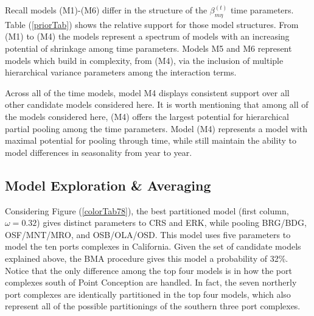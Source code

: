 \documentclass[12pt]{article}
\begin{document}
Recall models (M1)-(M6) differ in the structure of the \(\beta^{(t)}_{m\eta}\) 
time parameters. Table (\ref{priorTab}) shows the relative support for those 
model structures. From (M1) to (M4) the models represent a spectrum of models 
with an increasing potential of shrinkage among time parameters. Models 
M5 and M6 represent models which build in complexity, from (M4), via 
the inclusion of multiple hierarchical variance parameters among 
the interaction terms.

Across all of the time models, model M4 displays consistent support over
all other candidate models considered here. It is worth mentioning that
among all of the models considered here, (M4) offers the largest
potential for hierarchical partial pooling among the time parameters.
Model (M4) represents a model with maximal potential for pooling through
time, while still maintain the ability to model differences in
seasonality from year to year.

\subsection{Model Exploration \& Averaging}\label{model-exploration-averaging-1}



Considering Figure (\ref{colorTab78}), the best partitioned model
(first column, \(\omega=0.32\)) gives distinct parameters to CRS and
ERK, while pooling BRG/BDG, OSF/MNT/MRO, and OSB/OLA/OSD. This model
uses five parameters to model the ten ports complexes in California.
Given the set of candidate models explained above, the BMA procedure
gives this model a probability of 32\%. Notice that the only difference among 
the top four models is in how the port complexes south of Point Conception are 
handled. In fact, the seven northerly port complexes are identically 
partitioned in the top four models, which also represent all of the possible 
partitionings of the southern three port complexes.
\end{document}
